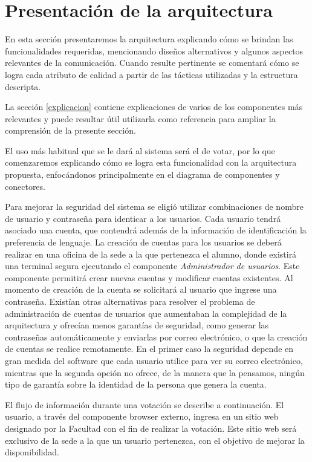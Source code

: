 \section{Presentación de la arquitectura}

En esta sección presentaremos la arquitectura explicando cómo se brindan las funcionalidades requeridas, mencionando diseños alternativos y algunos aspectos relevantes de la comunicación. Cuando resulte pertinente se comentará cómo se logra cada atributo de calidad a partir de las tácticas utilizadas y la estructura descripta. 


La sección \ref{explicacion} contiene explicaciones de varios de los componentes más relevantes y puede resultar útil utilizarla como referencia para ampliar la comprensión de la presente sección.


El uso más habitual que se le dará al sistema será el de votar, por lo que comenzaremos explicando cómo se logra esta funcionalidad con la arquitectura propuesta, enfocándonos principalmente en el diagrama de componentes y conectores.


Para mejorar la seguridad del sistema se eligió utilizar combinaciones de nombre de usuario y contraseña para identicar a los usuarios. Cada usuario tendrá asociado una cuenta, que contendrá además de la información de identificación la preferencia de lenguaje. La creación de cuentas para los usuarios se deberá realizar en una oficina de la sede a la que pertenezca el alumno, donde existirá una terminal segura ejecutando el componente \emph{Administrador de usuarios}. Este componente permitirá crear nuevas cuentas y modificar cuentas existentes. Al momento de creación de la cuenta se solicitará al usuario que ingrese una contraseña. Existían otras alternativas para resolver el problema de administración de cuentas de usuarios que aumentaban la complejidad de la arquitectura y ofrecían menos garantías de seguridad, como generar las contraseñas automáticamente y enviarlas por correo electrónico, o que la creación de cuentas se realice remotamente. En el primer caso la seguridad depende en gran medida del software que cada usuario utilice para ver su correo electrónico, mientras que la segunda opción no ofrece, de la manera que la pensamos, ningún tipo de garantía sobre la identidad de la persona que genera la cuenta.

El flujo de información durante una votación se describe a continuación. El usuario, a través del componente browser externo, ingresa en un sitio web designado por la Facultad con el fin de realizar la votación.  Este sitio web será exclusivo de la sede a la que un usuario pertenezca, con el objetivo de mejorar la disponibilidad. 

